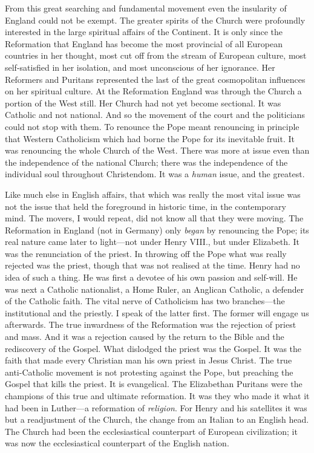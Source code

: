 \documentclass[12pt,a5paper,twoside]{book}
\begin{document}
From this great searching and fundamental movement 
even the insularity of England could not be 
exempt. The greater spirits of the Church were 
profoundly interested in the large spiritual affairs of 
the Continent. It is only since the Reformation 
that England has become the most provincial of all 
European countries in her thought, most cut off from 
the stream of European culture, most self-satisfied in 
her isolation, and most unconscious of her ignorance. 
Her Reformers and Puritans represented the last of 
the great cosmopolitan influences on her spiritual 
culture. At the Reformation England was through 
the Church a portion of the West still. Her Church 
had not yet become sectional. It was Catholic and 
not national. And so the movement of the court 
and the politicians could not stop with them. To 
renounce the Pope meant renouncing in principle 
that Western Catholicism which had borne the Pope 
for its inevitable fruit. It was renouncing the whole 
Church of the West. There was more at issue 
even than the independence of the national Church; 
there was the independence of the individual soul 
throughout Christendom. It was a \textit{human} issue, and 
the greatest. 

Like much else in English affairs, that which was 
really the most vital issue was not the issue that held 
the foreground in historic time, in the contemporary 
mind. The movers, I would repeat, did not know 
all that they were moving. The Reformation in 
England (not in Germany) only \textit{began} by renouncing 
the Pope; its real nature came later to light---not 
under Henry VIII., but under Elizabeth. It was the 
renunciation of the priest. In throwing off the Pope 
what was really rejected was the priest, though that 
was not realised at the time. Henry had no idea of 
such a thing. He was first a devotee of his own 
passion and self-will. He was next a Catholic nationalist, 
a Home Ruler, an Anglican Catholic, a defender 
of the Catholic faith. The vital nerve of Catholicism 
has two branches---the institutional and the priestly. 
I speak of the latter first. The former will engage us 
afterwards. The true inwardness of the Reformation 
was the rejection of priest and mass. And it was a 
rejection caused by the return to the Bible and the 
rediscovery of the Gospel. What dislodged the priest 
was the Gospel. It was the faith that made every 
Christian man his own priest in Jesus Christ. The 
true anti-Catholic movement is not protesting against 
the Pope, but preaching the Gospel that kills the 
priest. It is evangelical. The Elizabethan Puritans 
were the champions of this true and ultimate reformation. 
It was they who made it what it had been 
in Luther---a reformation of \textit{religion}. For Henry and 
his satellites it was but a readjustment of the Church, 
the change from an Italian to an English head. The 
Church had been the ecclesiastical counterpart of 
European civilization; it was now the ecclesiastical 
counterpart of the English nation. 
\end{document}
